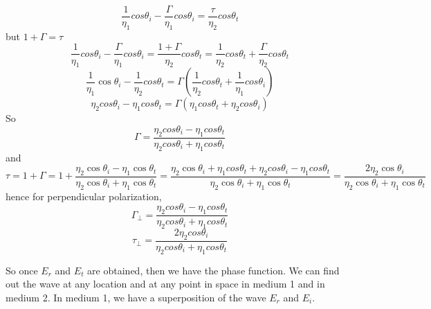 \begin{equation*}
	\frac{1}{\eta_{1}}cos\theta_{i} - \frac{\Gamma}{\eta_{1}}cos\theta_{i} = \frac{\tau}{\eta_{2}}cos\theta_{t}
\end{equation*}
but $1 + \Gamma = \tau$
\begin{dmath*}
	\frac{1}{\eta_{1}}cos\theta_{i} - \frac{\Gamma}{\eta_{1}}cos\theta_{i} = \frac{1+\Gamma}{\eta_{2}}cos\theta_{t} = \frac{1}{\eta_{2}}cos\theta_{t} + \frac{\Gamma}{\eta_{2}}cos\theta_{t}
\end{dmath*}
\begin{equation*}
	\frac{1}{\eta_{1}}\cos\theta_{i} - \frac{1}{\eta_{2}}cos\theta_{t} 	= \Gamma( \frac{1}{\eta_{2}}cos\theta_{t} + \frac{1}{\eta_{1}}cos\theta_{i})
\end{equation*}
$$\eta_{2}cos\theta_{i} - \eta_{1}cos\theta_{t} = \Gamma(\eta_{1}cos\theta_{t} + \eta_{2}cos\theta_{i})$$
So
$$\Gamma = \frac{\eta_{2}cos\theta_{i} - \eta_{1}cos\theta_{t}}{\eta_{2}cos\theta_{i} + \eta_{1}cos\theta_{t}}$$
and
\begin{dmath*}
\tau = 1 + \Gamma = 1 + \frac{\eta_{2}\cos\theta_{i} - \eta_{1}\cos\theta_{t}}{\eta_{2}\cos\theta_{i} + \eta_{1}\cos\theta_{t}}
= \frac{\eta_{2}\cos\theta_{i} + \eta_{1}cos\theta_{t} + \eta_{2}cos\theta_{i} - \eta_{1}cos\theta_{t}}{\eta_{2}\cos\theta_{i} + \eta_{1}\cos\theta_{t}} = \frac{2 \eta_{2}\cos\theta_{i}}{\eta_{2}\cos\theta_{i} + \eta_{1}\cos\theta_{t}}
\end{dmath*}
hence for perpendicular polarization,
\begin{dmath}
\Gamma_{\perp} = \frac{\eta_{2}cos\theta_{i} - \eta_{1}cos\theta_{t}}{\eta_{2}cos\theta_{i} + \eta_{1}cos\theta_{t}}
\label{equation3_Lec31}
\end{dmath}
\begin{dmath}
\tau_{\perp} = \frac{2 \eta_{2}cos\theta_{i}}{\eta_{2}cos\theta_{i} + \eta_{1}cos\theta_{t}}
\label{equation4_Lec31}
\end{dmath}


So once $E_{r}$ and $E_{t}$ are obtained, then we have the phase function. We can find out the wave at any location and at any point in space in medium 1 and in medium 2. In medium  1, we have a superposition of the wave $E_{r}$ and $E_{i}$.

